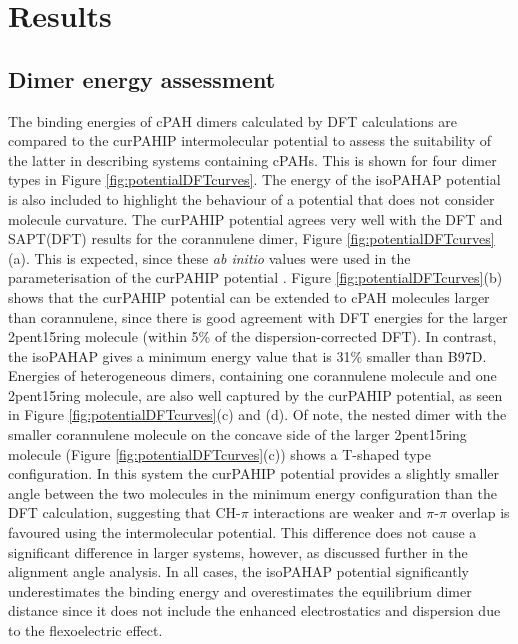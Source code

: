 \section{Results}
\subsection{Dimer energy assessment} %
The binding energies of cPAH dimers calculated by DFT calculations are compared to the curPAHIP intermolecular potential to assess the suitability of the latter in describing systems containing cPAHs.  This is shown for four dimer types in Figure \ref{fig:potentialDFTcurves}.  The energy of the isoPAHAP potential is also included to highlight the behaviour of a potential that does not consider molecule curvature.
The curPAHIP potential agrees very well with the DFT and SAPT(DFT) results for the corannulene dimer, Figure \ref{fig:potentialDFTcurves}(a). This is expected, since these \textit{ab initio} values were used in the parameterisation of the curPAHIP potential \cite{bowal2019ion}. 
Figure \ref{fig:potentialDFTcurves}(b) shows that the curPAHIP potential can be extended to cPAH molecules larger than corannulene, since there is good agreement with DFT energies for the larger 2pent15ring molecule (within 5\% of the dispersion-corrected DFT). In contrast, the isoPAHAP gives a minimum energy value that is 31\% smaller than B97D.
Energies of heterogeneous dimers, containing one corannulene molecule and one 2pent15ring molecule, are also well captured by the curPAHIP potential, as seen in Figure \ref{fig:potentialDFTcurves}(c) and (d).  Of note, the nested dimer with the smaller corannulene molecule on the concave side of the larger 2pent15ring molecule (Figure \ref{fig:potentialDFTcurves}(c)) shows a T-shaped type configuration. In this system the curPAHIP potential provides a slightly smaller %
angle between the two molecules in the minimum energy configuration than the DFT calculation, suggesting that CH-$\pi$ interactions are weaker and $\pi$-$\pi$ overlap is favoured using the intermolecular potential.  This difference does not cause a significant difference in larger systems, however, as discussed further in the alignment angle analysis. %
In all cases, the isoPAHAP potential significantly underestimates the binding energy and overestimates the equilibrium dimer distance since it does not include the enhanced electrostatics and dispersion due to the flexoelectric effect.
